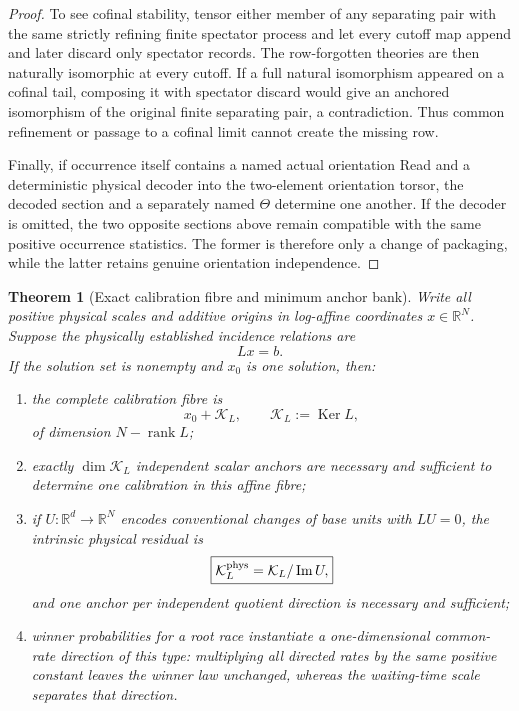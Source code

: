 \documentclass[11pt]{article}
\newtheorem{theorem}{Theorem}[section]
\theoremstyle{definition}
\theoremstyle{remark}
\newcommand{\rank}{\operatorname{rank}}
\newcommand{\Ker}{\operatorname{Ker}}
\begin{document}
\begin{proof}
To see cofinal stability, tensor either member of any separating pair with the
same strictly refining finite spectator process and let every cutoff map append
and later discard only spectator records.  The row-forgotten theories are then
naturally isomorphic at every cutoff.  If a full natural isomorphism appeared
on a cofinal tail, composing it with spectator discard would give an anchored
isomorphism of the original finite separating pair, a contradiction.  Thus
common refinement or passage to a cofinal limit cannot create the missing row.

Finally, if occurrence itself contains a named actual orientation Read and a
deterministic physical decoder into the two-element orientation torsor, the
decoded section and a separately named $\Theta$ determine one another.  If the
decoder is omitted, the two opposite sections above remain compatible with the
same positive occurrence statistics.  The former is therefore only a change
of packaging, while the latter retains genuine orientation independence.
\end{proof}

\begin{theorem}[Exact calibration fibre and minimum anchor bank]
\label{thm:supp-calibration-fibre}
Write all positive physical scales and additive origins in log-affine
coordinates $x\in\mathbb R^N$.  Suppose the physically established incidence
relations are
\begin{equation}
 Lx=b.
 \label{eq:supp-calibration-incidence}
\end{equation}
If the solution set is nonempty and $x_0$ is one solution, then:
\begin{enumerate}[label=\textup{(K\arabic*)},leftmargin=3em]
\item the complete calibration fibre is
      \begin{equation}
       \boxed{x_0+\mathcal K_L,
       \qquad \mathcal K_L:=\Ker L,}
       \label{eq:supp-calibration-fibre}
      \end{equation}
      of dimension $N-\rank L$;
\item exactly $\dim\mathcal K_L$ independent scalar anchors are necessary and
      sufficient to determine one calibration in this affine fibre;
\item if $U:\mathbb R^d\to\mathbb R^N$ encodes conventional changes of base
      units with $LU=0$, the intrinsic physical residual is
      \begin{equation}
       \boxed{
       \mathcal K_L^{\rm phys}
       =\mathcal K_L/\operatorname{Im}U,}
       \label{eq:supp-physical-calibration-fibre}
      \end{equation}
      and one anchor per independent quotient direction is necessary and
      sufficient;
\item winner probabilities for a root race instantiate a one-dimensional
      common-rate direction of this type: multiplying all directed rates by the
      same positive constant leaves the winner law unchanged, whereas the
      waiting-time scale separates that direction.
\end{enumerate}
\end{theorem}
\end{document}
